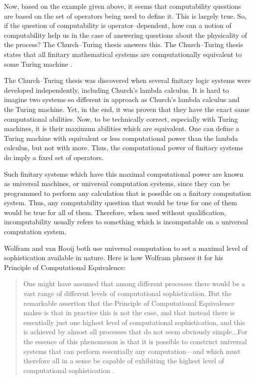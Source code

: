 Now, based on the example given above, it seems that computability questions are based on the set of operators being used to define it.  This is largely true.  So, if the question of computability is operator--dependent, how can a notion of computability help us in the case of answering questions about the physicality of the process?  The Church--Turing thesis answers this.  The Church--Turing thesis states that all finitary mathematical systems are computationally equivalent to some Turing machine \citep{turing1939}.    

The Church--Turing thesis was discovered when several finitary logic systems were developed independently, including Church's lambda calculus.  It is hard to imagine two systems so different in approach as Church's lambda calculus and the Turing machine.  Yet, in the end, it was proven that they have the exact same computational abilities.  Now, to be technically correct, especially with Turing machines, it is their maximum abilities which are equivalent.  One can define a Turing machine with equivalent or less computational power than the lambda calculus, but not with more.  Thus, the computational power of finitary systems do imply a fixed set of operators.  

Such finitary systems which have this maximal computational power are known as universal machines, or universal computation systems, since they can be programmed to perform any calculation that is possible on a finitary computation system.  Thus, any computability question that would be true for one of them would be true for all of them.  Therefore, when used without qualification, incomputability usually refers to something which is incomputable on a universal computation system.

Wolfram and van Rooij both use universal computation to set a maximal level of sophistication available in nature.  Here is how Wolfram phrases it for his Principle of Computational Equivalence:

\begin{quote}
One might have assumed that among different processes there would be a vast range of different levels of computational sophistication.  But the remarkable assertion that the Principle of Computational Equivalence makes is that in practice this is not the case, and that instead there is essentially just one highest level of computational sophistication, and this is achieved by almost all processes that do not seem obviously simple...For the essence of this phenomenon is that it is possible to construct universal systems that can perform essentially any computation---and which must therefore all in a sense be capable of exhibiting the highest level of computational sophistication \citep[][pg. 717]{wolfram2002}.
\end{quote}

